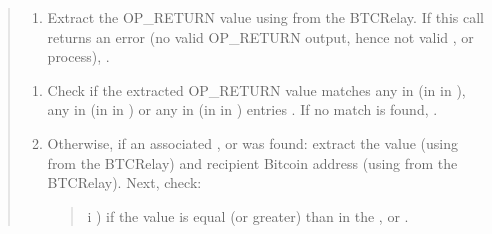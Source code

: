 \documentclass[a4paper,10pt,english]{sphinxmanual}
\begin{document}
\begin{quote}
\begin{enumerate}
%
\item {} 
Extract the OP\_RETURN value using  from the BTC\sphinxhyphen{}Relay. If this call returns an error (no valid OP\_RETURN output, hence not valid {\hyperref[\detokenize{spec/redeem:redeem-protocol}]{}}, {\hyperref[\detokenize{spec/replace:replace-protocol}]{}} or {\hyperref[\detokenize{spec/refund:refund-protocol}]{}} process), .

\end{enumerate}
\begin{enumerate}
%
\setcounter{enumi}{2}
\item {} 
Check if the extracted OP\_RETURN value matches any  in  (in  in {\hyperref[\detokenize{spec/redeem:redeem-protocol}]{}}), any  in  (in  in {\hyperref[\detokenize{spec/redeem:redeem-protocol}]{}}) or any  in  (in  in {\hyperref[\detokenize{spec/refund:refund-protocol}]{}}) entries . If no match is found, .

\item {} 
Otherwise, if an associated ,  or  was found: extract the value (using  from the BTC\sphinxhyphen{}Relay) and recipient Bitcoin address (using  from the BTC\sphinxhyphen{}Relay). Next, check:
\begin{quote}

i ) if the value is equal (or greater) than  in the ,  or .


\end{quote}
\end{enumerate}
\end{quote}
\end{document}
